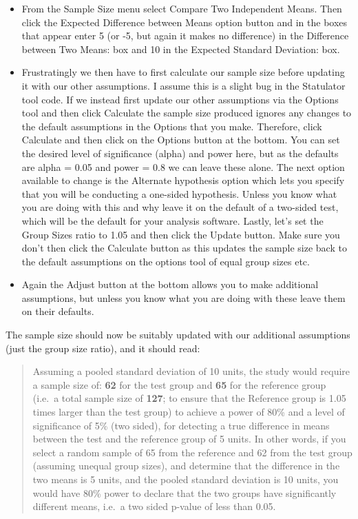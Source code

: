 \documentclass[
]{book}
\begin{document}
\begin{itemize}
\item
  From the Sample Size menu select Compare Two Independent Means. Then click the Expected Difference between Means option button and in the boxes that appear enter 5 (or -5, but again it makes no difference) in the Difference between Two Means: box and 10 in the Expected Standard Deviation: box.
\item
  Frustratingly we then have to first calculate our sample size before updating it with our other assumptions. I assume this is a slight bug in the Statulator tool code. If we instead first update our other assumptions via the Options tool and then click Calculate the sample size produced ignores any changes to the default assumptions in the Options that you make. Therefore, click Calculate and then click on the Options button at the bottom. You can set the desired level of significance (alpha) and power here, but as the defaults are alpha = 0.05 and power = 0.8 we can leave these alone. The next option available to change is the Alternate hypothesis option which lets you specify that you will be conducting a one-sided hypothesis. Unless you know what you are doing with this and why leave it on the default of a two-sided test, which will be the default for your analysis software. Lastly, let's set the Group Sizes ratio to 1.05 and then click the Update button. Make sure you don't then click the Calculate button as this updates the sample size back to the default assumptions on the options tool of equal group sizes etc.
\item
  Again the Adjust button at the bottom allows you to make additional assumptions, but unless you know what you are doing with these leave them on their defaults.
\end{itemize}

The sample size should now be suitably updated with our additional assumptions (just the group size ratio), and it should read:

\begin{quote}
Assuming a pooled standard deviation of 10 units, the study would require a sample size of: \textbf{62} for the test group and \textbf{65} for the reference group (i.e.~a total sample size of \textbf{127}; to ensure that the Reference group is 1.05 times larger than the test group) to achieve a power of 80\% and a level of significance of 5\% (two sided), for detecting a true difference in means between the test and the reference group of 5 units. In other words, if you select a random sample of 65 from the reference and 62 from the test group (assuming unequal group sizes), and determine that the difference in the two means is 5 units, and the pooled standard deviation is 10 units, you would have 80\% power to declare that the two groups have significantly different means, i.e.~a two sided p-value of less than 0.05.
\end{quote}
\end{document}
